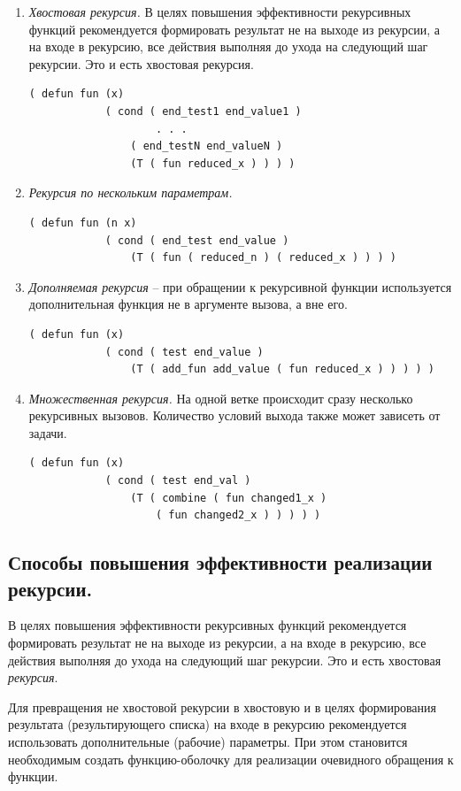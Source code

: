 \documentclass[a4paper,12pt]{article}
\begin{document}
 	\begin{enumerate}
 		\item \textit{Хвостовая рекурсия.}
 		В целях повышения эффективности рекурсивных функций рекомендуется
 		формировать результат не на выходе из рекурсии, а на входе в рекурсию,
 		все действия выполняя до ухода на следующий шаг рекурсии. Это и есть
 		хвостовая рекурсия.
 		\begin{lstlisting}[label=lst1,caption=Хвостовая рекурсия]
 		( defun fun (x)
 			( cond ( end_test1 end_value1 )
 		 			. . .
 				( end_testN end_valueN )
 				(T ( fun reduced_x ) ) ) )
 		\end{lstlisting}
 		\item \textit{Рекурсия по нескольким параметрам.}
 		\begin{lstlisting}[label=lst2,caption=Рекурсия по нескольким параметрам]
 		( defun fun (n x)
 			( cond ( end_test end_value )
 				(T ( fun ( reduced_n ) ( reduced_x ) ) ) )
 		\end{lstlisting}
 		\item \textit{Дополняемая рекурсия} – при обращении к рекурсивной функции используется дополнительная функция не в аргументе вызова, а вне его.
 		\begin{lstlisting}[label=lst3,caption=Дополняемая рекурсия]
 		( defun fun (x)
 			( cond ( test end_value )
 				(T ( add_fun add_value ( fun reduced_x ) ) ) ) )
 		\end{lstlisting}
 		\item \textit{Множественная рекурсия.} На одной ветке происходит сразу несколько рекурсивных вызовов. Количество условий выхода также может зависеть от задачи.
 		\begin{lstlisting}[label=lst4,caption=Множественная рекурсия]
 		( defun fun (x)
 			( cond ( test end_val )
 				(T ( combine ( fun changed1_x )
 					( fun changed2_x ) ) ) ) )
 		\end{lstlisting}
 	\end{enumerate}
 	
 	\subsection*{Способы повышения эффективности реализации рекурсии.}
 	
 	В целях повышения эффективности рекурсивных функций рекомендуется
 	формировать результат не на выходе из рекурсии, а на входе в рекурсию, все
 	действия выполняя до ухода на следующий шаг рекурсии. Это и есть хвостовая
 	\textit{рекурсия}.
 	
 	Для превращения не хвостовой рекурсии в хвостовую и в целях формирования результата (результирующего списка) на входе в рекурсию рекомендуется
 	использовать дополнительные (рабочие) параметры. При этом становится необходимым создать функцию-оболочку для реализации очевидного обращения к
 	функции.
 	
 	
\end{document}
